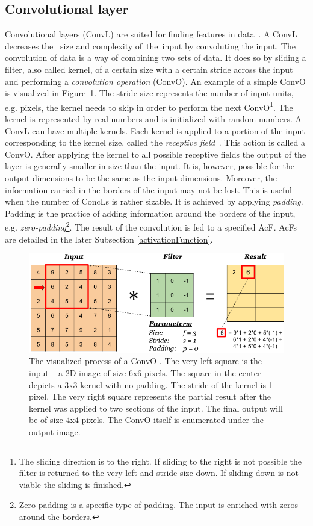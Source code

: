 \subsection{Convolutional layer}\label{convolutionalLayers}
Convolutional layers (ConvL) are suited for finding features in data~\cite{CNN}. A ConvL decreases the~ size and complexity of~the~input by convoluting the input. The convolution of data is a way of combining two sets of data.  It does so by sliding a filter, also called kernel, of a certain size with a certain stride across the input and performing a \textit{convolution operation} (ConvO). An example of a simple ConvO is visualized in Figure~\ref{convolutionalLayerVisualization}. The stride size represents the number of input-units, e.g. pixels, the kernel needs to skip in order to perform the next ConvO\footnote{The sliding direction is to the right. If sliding to the right is not possible the filter is returned to the very left and stride-size down. If sliding down is not viable the sliding is finished.}. The kernel is represented by real numbers and is initialized with random numbers. A ConvL can have multiple kernels. Each kernel is applied to a portion of the input corresponding to the kernel size, called the \textit{receptive field}~\cite{receptiveField}. This action is called a ConvO. After applying the kernel to all possible receptive fields the output of the layer is generally smaller in size than the input. It is, however, possible for the output dimensions to be the same as the input dimensions. Moreover, the information carried in the borders of the input may not be lost. This is useful when the number of ConcLs is rather sizable. It is achieved by applying \textit{padding}. Padding is the practice of adding information around the borders of the input, e.g. \textit{zero-padding}\footnote{Zero-padding is a specific type of padding. The input is enriched with zeros around the borders.}. The result of the convolution is fed to a specified AcF. AcFs are detailed in the later Subsection \ref{activationFunction}.
\begin{figure}[ht!]
  \centering
  \includegraphics[width=\textwidth]{Images/convolutionOperation.png}
  \caption{The visualized process of a ConvO \cite{convolutionOperationVisualization}. The very left square is the input -- a 2D image of size 6x6 pixels. The square in the center depicts a 3x3 kernel with no padding. The stride of the kernel is 1 pixel. The very right square represents the partial result after the kernel was applied to two sections of the input. The final output will be of size 4x4 pixels. The ConvO itself is enumerated under the output image.} 
  \label{convolutionalLayerVisualization}
\end{figure} 

